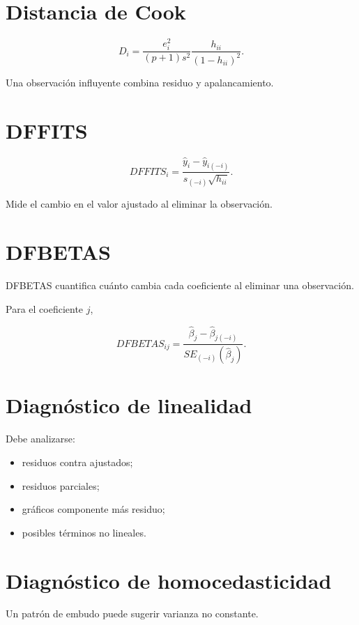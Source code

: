 \documentclass[
  spanish,
  11pt,
  letterpaper,
  DIV=11,
  numbers=noendperiod]{scrreprt}
\providecommand{\tightlist}{%
  \setlength{\itemsep}{0pt}\setlength{\parskip}{0pt}}
\theoremstyle{definition}
\theoremstyle{plain}
\theoremstyle{definition}
\theoremstyle{remark}
\begin{document}
\section{Distancia de Cook}\label{distancia-de-cook-1}

\[
D_i
=
\frac{
e_i^2
}{
(p+1)s^2
}
\frac{
h_{ii}
}{
(1-h_{ii})^2
}.
\]

Una observación influyente combina residuo y apalancamiento.

\section{DFFITS}\label{dffits}

\[
DFFITS_i
=
\frac{
\widehat{y}_i
-
\widehat{y}_{i(-i)}
}{
s_{(-i)}
\sqrt{h_{ii}}
}.
\]

Mide el cambio en el valor ajustado al eliminar la observación.

\section{DFBETAS}\label{dfbetas}

DFBETAS cuantifica cuánto cambia cada coeficiente al eliminar una
observación.

Para el coeficiente \(j\),

\[
DFBETAS_{ij}
=
\frac{
\widehat{\beta}_j
-
\widehat{\beta}_{j(-i)}
}{
SE_{(-i)}(\widehat{\beta}_j)
}.
\]

\section{Diagnóstico de
linealidad}\label{diagnuxf3stico-de-linealidad-1}

Debe analizarse:

\begin{itemize}
\tightlist
\item
  residuos contra ajustados;
\item
  residuos parciales;
\item
  gráficos componente más residuo;
\item
  posibles términos no lineales.
\end{itemize}

\section{Diagnóstico de
homocedasticidad}\label{diagnuxf3stico-de-homocedasticidad-1}

Un patrón de embudo puede sugerir varianza no constante.
\end{document}

